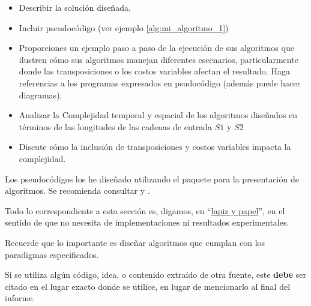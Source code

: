\begin{itemize}
    \item Describir la solución diseñada. 
    \item Incluir pseudocódigo (ver ejemplo \cref{alg:mi_algoritmo_1})
    \item Proporciones un ejemplo paso a paso de la ejecución de sus algoritmos que ilustren cómo sus algoritmos manejan diferentes escenarios, particularmente donde las
    transposiciones o los costos variables afectan el
    resultado. Haga referencias a los programas expresados en psudocódigo (además puede hacer diagramas).
    \item Analizar la Complejidad temporal y espacial de los algoritmos diseñados en términos de las longitudes de las cadenas de entrada $S1$ y $S2$
    \item Discute cómo la inclusión de transposiciones y costos   variables impacta la complejidad.
\end{itemize}

Los pseudocódigos los he diseñado utilizando el paquete  \cite{algorithm2e} para la presentación de algoritmos. Se recomienda consultar  \cite{ctan-algorithm2e} y  \cite{overleaf-algorithms}.

Todo lo correspondiente a esta sección es, digamos, en ``\href{https://dle.rae.es/metáfora}{lapiz y papel}'', en el sentido de que no necesita de implementaciones ni resultados experimentales. 

\begin{mdframed}
    Recuerde que lo importante es diseñar algoritmos que cumplan con los paradigmas especificados. 
\end{mdframed}

\begin{mdframed}
    Si se utiliza algún código, idea, o contenido extraído de otra fuente, este \textbf{debe} ser citado en el lugar exacto donde se utilice, en lugar de mencionarlo al final del informe. 
\end{mdframed}


